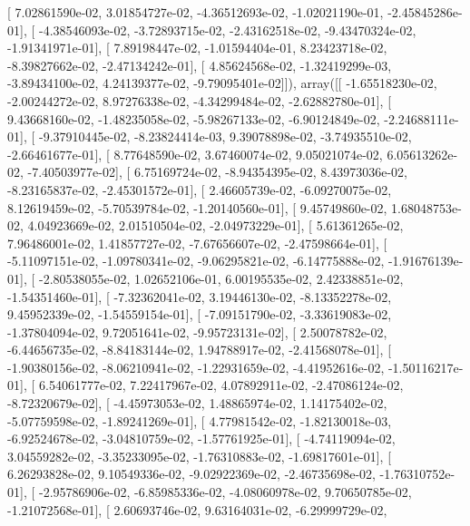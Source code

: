 \documentclass{article}
\begin{document}
       [  7.02861590e-02,   3.01854727e-02,  -4.36512693e-02,
         -1.02021190e-01,  -2.45845286e-01],
       [ -4.38546093e-02,  -3.72893715e-02,  -2.43162518e-02,
         -9.43470324e-02,  -1.91341971e-01],
       [  7.89198447e-02,  -1.01594404e-01,   8.23423718e-02,
         -8.39827662e-02,  -2.47134242e-01],
       [  4.85624568e-02,  -1.32419299e-03,  -3.89434100e-02,
          4.24139377e-02,  -9.79095401e-02]]), array([[ -1.65518230e-02,  -2.00244272e-02,   8.97276338e-02,
         -4.34299484e-02,  -2.62882780e-01],
       [  9.43668160e-02,  -1.48235058e-02,  -5.98267133e-02,
         -6.90124849e-02,  -2.24688111e-01],
       [ -9.37910445e-02,  -8.23824414e-03,   9.39078898e-02,
         -3.74935510e-02,  -2.66461677e-01],
       [  8.77648590e-02,   3.67460074e-02,   9.05021074e-02,
          6.05613262e-02,  -7.40503977e-02],
       [  6.75169724e-02,  -8.94354395e-02,   8.43973036e-02,
         -8.23165837e-02,  -2.45301572e-01],
       [  2.46605739e-02,  -6.09270075e-02,   8.12619459e-02,
         -5.70539784e-02,  -1.20140560e-01],
       [  9.45749860e-02,   1.68048753e-02,   4.04923669e-02,
          2.01510504e-02,  -2.04973229e-01],
       [  5.61361265e-02,   7.96486001e-02,   1.41857727e-02,
         -7.67656607e-02,  -2.47598664e-01],
       [ -5.11097151e-02,  -1.09780341e-02,  -9.06295821e-02,
         -6.14775888e-02,  -1.91676139e-01],
       [ -2.80538055e-02,   1.02652106e-01,   6.00195535e-02,
          2.42338851e-02,  -1.54351460e-01],
       [ -7.32362041e-02,   3.19446130e-02,  -8.13352278e-02,
          9.45952339e-02,  -1.54559154e-01],
       [ -7.09151790e-02,  -3.33619083e-02,  -1.37804094e-02,
          9.72051641e-02,  -9.95723131e-02],
       [  2.50078782e-02,  -6.44656735e-02,  -8.84183144e-02,
          1.94788917e-02,  -2.41568078e-01],
       [ -1.90380156e-02,  -8.06210941e-02,  -1.22931659e-02,
         -4.41952616e-02,  -1.50116217e-01],
       [  6.54061777e-02,   7.22417967e-02,   4.07892911e-02,
         -2.47086124e-02,  -8.72320679e-02],
       [ -4.45973053e-02,   1.48865974e-02,   1.14175402e-02,
         -5.07759598e-02,  -1.89241269e-01],
       [  4.77981542e-02,  -1.82130018e-03,  -6.92524678e-02,
         -3.04810759e-02,  -1.57761925e-01],
       [ -4.74119094e-02,   3.04559282e-02,  -3.35233095e-02,
         -1.76310883e-02,  -1.69817601e-01],
       [  6.26293828e-02,   9.10549336e-02,  -9.02922369e-02,
         -2.46735698e-02,  -1.76310752e-01],
       [ -2.95786906e-02,  -6.85985336e-02,  -4.08060978e-02,
          9.70650785e-02,  -1.21072568e-01],
       [  2.60693746e-02,   9.63164031e-02,  -6.29999729e-02,
\end{document}
